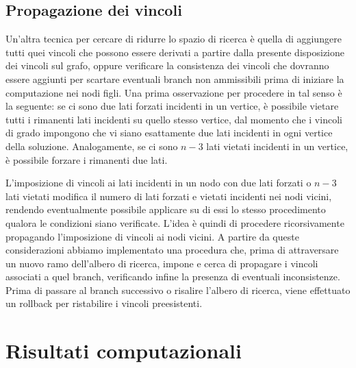 \subsection{Propagazione dei vincoli}
Un'altra tecnica per cercare di ridurre lo spazio di ricerca è quella di aggiungere tutti quei vincoli che possono essere derivati a partire dalla presente disposizione dei vincoli sul grafo, oppure verificare la consistenza dei vincoli che dovranno essere aggiunti per scartare eventuali branch non ammissibili prima di iniziare la computazione nei nodi figli. Una prima osservazione per procedere in tal senso è la seguente: se ci sono due lati forzati incidenti in un vertice, è possibile vietare tutti i rimanenti lati incidenti su quello stesso vertice, dal momento che i vincoli di grado impongono che vi siano esattamente due lati incidenti in ogni vertice della soluzione. Analogamente, se ci sono $n-3$ lati vietati incidenti in un vertice, è possibile forzare i rimanenti due lati. 

L'imposizione di vincoli ai lati incidenti in un nodo con due lati forzati o $n-3$ lati vietati modifica il numero di lati forzati e vietati incidenti nei nodi vicini, rendendo eventualmente possibile applicare su di essi lo stesso procedimento qualora le condizioni siano verificate. L'idea è quindi di procedere ricorsivamente propagando l'imposizione di vincoli ai nodi vicini. A partire da queste considerazioni abbiamo implementato una procedura che, prima di attraversare un nuovo ramo dell'albero di ricerca, impone e cerca di propagare i vincoli associati a quel branch, verificando infine la presenza di eventuali inconsistenze. Prima di passare al branch successivo o risalire l'albero di ricerca, viene effettuato un rollback per ristabilire i vincoli preesistenti.

\section{Risultati computazionali}
